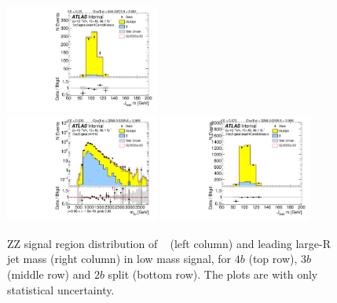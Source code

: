 \begin{figure}[htbp!]
\begin{center}
\includegraphics[width=0.45\textwidth,angle=-90]{figures/boosted/ZZ/Moriond_ZZ_ThreeTag_Signal_leadHCand_Mass_s.pdf}\\
\includegraphics[width=0.45\textwidth,angle=-90]{figures/boosted/ZZ/Moriond_ZZ_TwoTag_split_Signal_mHH_l_1.pdf}
\includegraphics[width=0.45\textwidth,angle=-90]{figures/boosted/ZZ/Moriond_ZZ_TwoTag_split_Signal_leadHCand_Mass_s.pdf}\\
\end{center}
\caption{ZZ signal region distribution of \mtwoJ~ (left column) and leading large-R jet mass (right column) in low mass signal, for $4b$ (top row), $3b$(middle row) and $2b$ split (bottom row). The plots are with only statistical uncertainty.}
\label{CRSB:ZZSR_Distribution}
\end{figure}

% 

